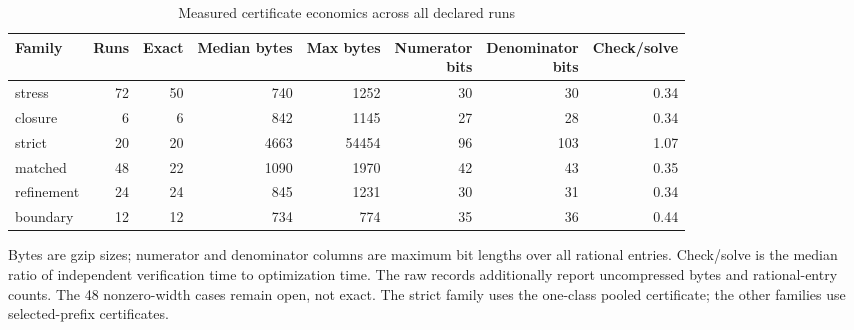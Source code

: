 \begin{table}[p]
\centering\small
\setlength{\tabcolsep}{3.5pt}
\caption{Measured certificate economics across all declared runs}\label{tab:r51-certificates}
\begin{tabular}{lrrrrrrr}
\toprule
Family & Runs & Exact & Median bytes & Max bytes & \shortstack{Numerator\\bits} & \shortstack{Denominator\\bits} & Check/solve \\
\midrule
stress & 72 & 50 & 740 & 1252 & 30 & 30 & 0.34 \\
closure & 6 & 6 & 842 & 1145 & 27 & 28 & 0.34 \\
strict & 20 & 20 & 4663 & 54454 & 96 & 103 & 1.07 \\
matched & 48 & 22 & 1090 & 1970 & 42 & 43 & 0.35 \\
refinement & 24 & 24 & 845 & 1231 & 30 & 31 & 0.34 \\
boundary & 12 & 12 & 734 & 774 & 35 & 36 & 0.44 \\
\bottomrule
\end{tabular}
\par\smallskip\begin{minipage}{\textwidth}\footnotesize Bytes are gzip sizes; numerator and denominator columns are maximum bit lengths over all rational entries. Check/solve is the median ratio of independent verification time to optimization time. The raw records additionally report uncompressed bytes and rational-entry counts. The 48 nonzero-width cases remain open, not exact. The strict family uses the one-class pooled certificate; the other families use selected-prefix certificates.\end{minipage}
\end{table}
